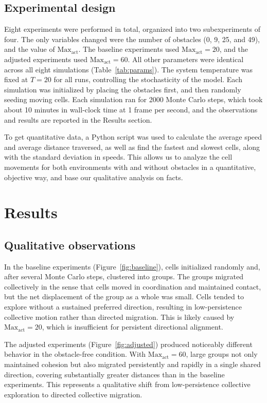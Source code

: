\documentclass{article}
\begin{document}
\subsection*{Experimental design}
Eight experiments were performed in total, organized into two subexperiments of four. The only variables changed
were the number of obstacles (0, 9, 25, and 49), and the value of $\text{Max}_\text{act}$. The baseline experiments
used $\text{Max}_\text{act} = 20$, and the adjusted experiments used $\text{Max}_\text{act} = 60$. All other
parameters were identical across all eight simulations (Table~\ref{tab:params}). The system temperature was
fixed at $T = 20$ for all runs, controlling the stochasticity of the model. Each simulation was initialized
by placing the obstacles first, and then randomly seeding moving cells. Each simulation ran for 2000 Monte Carlo
steps, which took about 10 minutes in wall-clock time at 1 frame per second, and the observations and results are
reported in the Results section.

To get quantitative data, a Python script was used to calculate the average speed and average distance traversed, as well as find the fastest and slowest cells, along with the standard deviation in speeds. This allows us to analyze the cell movements for both environments with and without obstacles in a quantitative, objective way, and base our qualitative analysis on facts.

\section{Results}
\subsection*{Qualitative observations}
In the baseline experiments (Figure~\ref{fig:baseline}), cells initialized randomly and, after several
Monte Carlo steps, clustered into groups. The groups migrated collectively in the sense that cells moved
in coordination and maintained contact, but the net displacement of the group as a whole was small.
Cells tended to explore without a sustained preferred direction, resulting in low-persistence
collective motion rather than directed migration. This is likely caused by $\text{Max}_\text{act} = 20$, which
is insufficient for persistent directional alignment.

The adjusted experiments (Figure~\ref{fig:adjusted}) produced noticeably different behavior in the
obstacle-free condition. With $\text{Max}_\text{act} = 60$, large groups not
only maintained cohesion but also migrated persistently and rapidly in a single shared direction,
covering substantially greater distances than in the baseline experiments. This represents a qualitative
shift from low-persistence collective exploration to directed collective migration.
\end{document}

